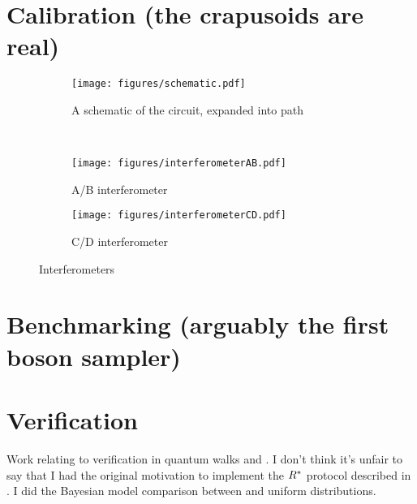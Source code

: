 \section{Calibration (the crapusoids are real)}
\label{sec:Calibration}
\begin{figure}
  \centering
  \begin{subfigure}{\textwidth}
    \texttt{[image: figures/schematic.pdf]}
    \caption{A schematic of the circuit, expanded into path}
    \label{fig:schematic}
  \end{subfigure} \\
  \vspace{1cm}
  \begin{subfigure}{0.45\textwidth}
    \texttt{[image: figures/interferometerAB.pdf]}
    \caption{A/B interferometer}
    \label{fig:ab}
  \end{subfigure}
  \hspace{0.05\textwidth}
  \begin{subfigure}{0.45\textwidth}
    \texttt{[image: figures/interferometerCD.pdf]}
    \caption{C/D interferometer}
    \label{fig:cd}
  \end{subfigure}
  \caption[Illustration of nested interferometers in the bulk Reck scheme]
  {Interferometers}
  \label{fig:interferometers}
\end{figure}

\section{Benchmarking (arguably the first boson sampler)}
\label{sec:Benchmarking}

\section{Verification}
\label{sec:Verification}
Work relating to verification in quantum walks and \bosonsampling. I don't think
it's unfair to say that I had the original motivation to implement the
\(R^{*}\) protocol described in \cite{aaronson13}. I did the Bayesian model
comparison between \bosonsampling and uniform distributions.
